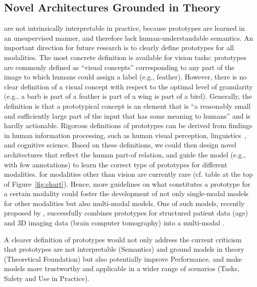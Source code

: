 \subsection{Novel Architectures Grounded in Theory}
\label{ssec:directions:architectures}
\ppms are not intrinsically interpretable in practice, because prototypes are learned in an unsupervised manner, and therefore lack human-understandable semantics.
An important direction for future research is to clearly define prototypes for all modalities. The most concrete definition is available for vision tasks: prototypes are commonly defined as ``visual concepts'' corresponding to any part of the image to which humans could assign a label (e.g., feather). However, there is no clear definition of a visual concept with respect to the optimal level of granularity (e.g., a barb is part of a feather is part of a wing is part of a bird). Generally, the definition is that a prototypical concept is an element that is ``a reasonably small and sufficiently large part of the input that has some meaning to humans'' and is hardly actionable.
Rigorous definitions of prototypes can be derived from findings in human information processing, such as human visual perception, linguistics~\cite{panther2008prototype}, and cognitive science. Based on these definitions, we could then design novel \ppm architectures that reflect the human part-of relation, and guide the model (e.g., with few annotations) to learn the correct type of prototypes for different modalities.
\ppms for modalities other than vision are currently rare (cf. table at the top of Figure~\ref{fig:chart}). Hence, more guidelines on what constitutes a prototype for a certain modality could foster the development of not only single-modal models for other modalities but also multi-modal models. One of such models, recently proposed by \cite{DeSanti2024_xailbr_pip3d-alzheimer}, successfully combines prototypes for structured patient data (age) and 3D imaging data (brain computer tomography) into a multi-modal \ppm.

A clearer definition of prototypes would not only address the current criticism that prototypes are not interpretable (\texorpdfstring{\colorbox[RGB]{191, 239, 239}{Semantics}}{Semantics})
and ground models in theory (\texorpdfstring{\colorbox[RGB]{156,198,246}{Theoretical Foundation}}{Theoretical Foundation}) %
but also potentially improve \texorpdfstring{\colorbox[RGB]{156,198,246}{Performance}}{Performance},
and make models more trustworthy and applicable in a wider range of scenarios ({\texorpdfstring{\colorbox[RGB]{255,199,166}{Tasks}}{Tasks}},
\texorpdfstring{\colorbox[RGB]{242,96,119}{Safety and Use in Practice}}{Safety and Use in Practice}).


